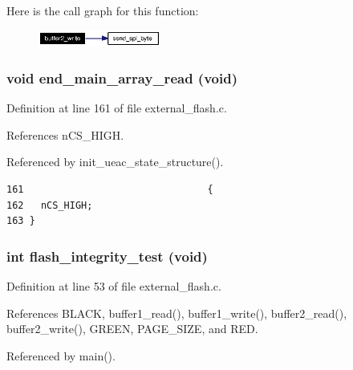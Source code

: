 Here is the call graph for this function:\begin{figure}[H]
\begin{center}
\leavevmode
\includegraphics[width=114pt]{external__flash_8h_a14_cgraph}
\end{center}
\end{figure}
\subsubsection{\setlength{\rightskip}{0pt plus 5cm}void end\_\-main\_\-array\_\-read (void)}\label{external__flash_8h_a8}




Definition at line 161 of file external\_\-flash.c.

References n\-CS\_\-HIGH.

Referenced by init\_\-ueac\_\-state\_\-structure().

\footnotesize\begin{verbatim}161                                {
162   nCS_HIGH;
163 }
\end{verbatim}\normalsize 


\subsubsection{\setlength{\rightskip}{0pt plus 5cm}int flash\_\-integrity\_\-test (void)}\label{external__flash_8h_a4}




Definition at line 53 of file external\_\-flash.c.

References BLACK, buffer1\_\-read(), buffer1\_\-write(), buffer2\_\-read(), buffer2\_\-write(), GREEN, PAGE\_\-SIZE, and RED.

Referenced by main().

